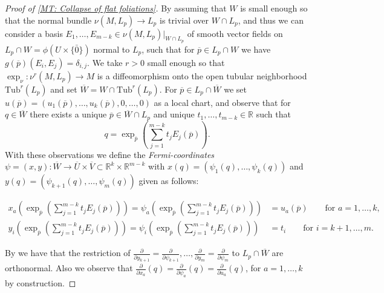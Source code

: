 \documentclass[12pt,a4paper,reqno]{amsart}
\theoremstyle{definition}
\numberwithin{equation}{section}
\newcommand{\R}{\mathbb{R}} %
\DeclareMathOperator{\expo}{exp}
\begin{document}
\begin{proof}[Proof of \th\ref{MT: Collapse of flat foliations}]
By assuming that $W$ is small enough so that the normal bundle $\nu(M,L_p)\to L_p$ is trivial over $W\cap L_p$,  and thus we can consider a basis $E_1,\ldots,E_{m-k}\in \nu(M,L_p)|_{W\cap L_p}$ of smooth vector fields on  $L_p\cap W = \phi(U\times\{\bar{0}\})$ normal to $L_p$, such that for $\overline{p}\in L_p\cap W$ we have $g(\overline{p})(E_i,E_j)= \delta_{i,j}$. We take $r>0$ small enough so that $\expo_\nu\colon \nu^{r}(M,L_p)\to M$ is a diffeomorphism onto the open tubular neighborhood $\mathrm{Tub}^{r}(L_p)$ and set $\overline{W} = W\cap \mathrm{Tub}^{r}(L_p)$. For $\overline{p}\in L_p\cap \overline{W}$ we set $u(\overline{p}) = (u_1(\overline{p}),\ldots,u_{k}(\overline{p}),0,\ldots,0)$ as a local chart, and observe that for $q\in \overline{W}$ there exists a unique $\overline{p}\in \overline{W}\cap L_p$ and unique $t_{1},\ldots,t_{m-k}\in\R$ such that 
\[
q = \expo_{\overline{p}}\left(\sum_{j=1}^{m-k} t_j E_j(\overline{p}) \right).
\] 
With these observations we define the \emph{Fermi-coordinates} $\psi=(x,y)\colon \overline{W}\to \overline{U}\times \overline{V}\subset \R^{k}\times \R^{m-k}$ with $x(q)=(\psi_1(q),\ldots,\psi_k(q))$ and $y(q)=(\psi_{k+1}(q),\ldots,\psi_m(q))$ given as follows:
\begin{linenomath}
\begin{align*}
x_a\left(\expo_{\overline{p}}\left(\sum_{j=1}^{m-k} t_j E_j(\overline{p})\right)\right)=\psi_a\left(\expo_{\overline{p}}\left(\sum_{j=1}^{m-k} t_j E_j(\overline{p})\right)\right) &= u_a(\overline{p})\qquad \mbox{for }a=1,\ldots,k,\\
y_i\left(\expo_{\overline{p}}\left(\sum_{j=1}^{m-k} t_j E_j(\overline{p})\right)\right)=\psi_i\left(\expo_{\overline{p}}\left(\sum_{j=1}^{m-k} t_j E_j(\overline{p})\right)\right) &=t_i\qquad \mbox{for }i=k+1,\ldots,m.
\end{align*}
\end{linenomath}

\noindent By \cite[Lemma~2.4]{Gray} we have that the restriction of $\frac{\partial}{\partial y_{k+1}}=\frac{\partial}{\partial \psi_{k+1}},\ldots, \frac{\partial}{\partial y_{m}}=\frac{\partial}{\partial \psi_m}$ to  $L_p\cap \overline{W}$ are orthonormal. Also we observe that $\frac{\partial}{\partial x_a}(q)=\frac{\partial}{\partial \psi_a}(q) = \frac{\partial}{\partial u_a}(q)$, for $a= 1,\ldots,k$ by construction.


\end{proof}
\end{document}
